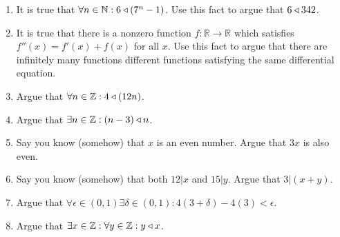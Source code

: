 \begin{xca}	
	\begin{enumerate}
		\item It is true that $\forall n \in \mathbb{N}: 6 \triangleleft (7^n-1)$.  Use this fact to argue that $6 \triangleleft 342$.
		\item It is true that there is a nonzero function $f: \mathbb{R} \to \mathbb{R}$ which satisfies $ f''(x) = f'(x)+f(x)$ for all $x$.  Use this fact to argue that there are infinitely many functions different functions satisfying the same differential equation.
		\item Argue that $\forall n \in \mathbb{Z}:  4 \triangleleft (12n)$.
		\item Argue that $\exists n \in \mathbb{Z}: (n-3) \triangleleft n$.
		\item Say you know (somehow) that $x$ is an even number.  Argue that $3x$ is also even.
		\item Say you know (somehow) that both $12|x$ and $15|y$.  Argue that $3|(x+y)$.
		\item Argue that $\forall \epsilon \in (0,1) \exists \delta \in (0,1): 4(3+\delta)-4(3) < \epsilon$.
		\item Argue that $\exists x \in \mathbb{Z}: \forall y \in \mathbb{Z}:  y \triangleleft x$.
		\end{enumerate}
	\end{xca}

